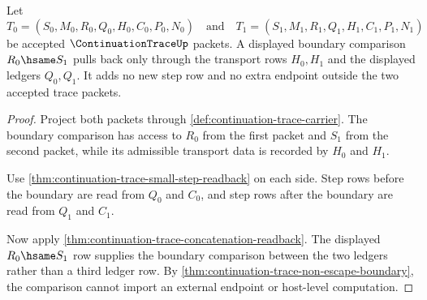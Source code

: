 \begin{theorem}
\label{thm:continuation-trace-boundary-hsame-pullback}
Let
$$
T_0=(S_0,M_0,R_0,Q_0,H_0,C_0,P_0,N_0)
\quad\text{and}\quad
T_1=(S_1,M_1,R_1,Q_1,H_1,C_1,P_1,N_1)
$$
be accepted $\ContinuationTraceUp$ packets. A displayed boundary comparison $R_0\hsame S_1$ pulls back only through the transport rows $H_0,H_1$ and the displayed ledgers $Q_0,Q_1$. It adds no new step row and no extra endpoint outside the two accepted trace packets.
\end{theorem}
\begin{proof}
Project both packets through \autoref{def:continuation-trace-carrier}. The boundary comparison has access to $R_0$ from the first packet and $S_1$ from the second packet, while its admissible transport data is recorded by $H_0$ and $H_1$.

Use \autoref{thm:continuation-trace-small-step-readback} on each side. Step rows before the boundary are read from $Q_0$ and $C_0$, and step rows after the boundary are read from $Q_1$ and $C_1$.

Now apply \autoref{thm:continuation-trace-concatenation-readback}. The displayed $R_0\hsame S_1$ row supplies the boundary comparison between the two ledgers rather than a third ledger row. By \autoref{thm:continuation-trace-non-escape-boundary}, the comparison cannot import an external endpoint or host-level computation.
\end{proof}

